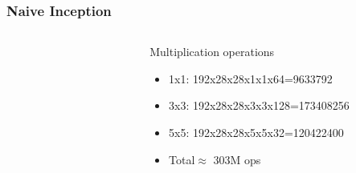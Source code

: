 \documentclass{beamer}
\begin{document}
\begin{frame}
	\frametitle{Naive Inception}
\begin{columns}
	\begin{column}{0.5\textwidth}

	
	\begin{figure}
    \end{figure}
		

\end{column}
\hfill
\begin{column}{0.4\textwidth}
	Multiplication operations
\tiny{
	\begin{itemize}
		\item 1x1: 192x28x28x1x1x64=9633792
		\item 3x3: 192x28x28x3x3x128=173408256
		\item 5x5: 192x28x28x5x5x32=120422400
		\item Total$\approx $ 303M ops
	\end{itemize}
		}
	
\end{column}
\end{columns}

\end{frame}
\end{document}
